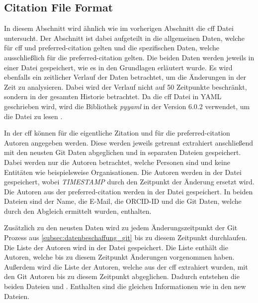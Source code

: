 \subsection{Citation File Format}
\label{subsec:datenbeschaffung_cff}
In diesem Abschnitt wird ähnlich wie im vorherigen Abschnitt die \gls{cff} Datei untersucht.
Der Abschnitt ist dabei aufgeteilt in die allgemeinen Daten, welche für \gls{cff} und \grqq preferred-citation\glqq{} gelten und die spezifischen Daten, welche ausschließlich für die \grqq preferred-citation\glqq{} gelten.
Die beiden Daten werden jeweils in einer  Datei gespeichert, wie es in den Grundlagen erläutert wurde.
Es wird ebenfalls ein zeitlicher Verlauf der Daten betrachtet, um die Änderungen in der Zeit zu analysieren.
Dabei wird der Verlauf nicht auf 50 Zeitpunkte beschränkt, sondern in der gesamten Historie betrachtet.
Da die \gls{cff} Datei in YAML geschrieben wird, wird die Bibliothek \emph{pyyaml} in der Version 6.0.2 verwendet, um die Datei zu lesen \autocite{noauthor_yamlpyyaml_2024}.

In der \gls{cff} können für die eigentliche Zitation und für die \grqq preferred-citation\glqq{} Autoren angegeben werden.
Diese werden jeweils getrennt extrahiert anschließend mit den neusten Git Daten abgeglichen und in separaten Dateien gespeichert.
Dabei werden nur die Autoren betrachtet, welche Personen sind und keine Entitäten wie beispielsweise Organisationen.
Die Autoren werden in der Datei  gespeichert, wobei \emph{TIMESTAMP} durch den Zeitpunkt der Änderung ersetzt wird.
Die Autoren aus der \grqq preferred-citation\glqq{} werden in der Datei  gespeichert.
In beiden Dateien sind der Name, die E-Mail, die ORCID-ID und die Git Daten, welche durch den Abgleich ermittelt wurden, enthalten.

Zusätzlich zu den neusten Daten wird zu jedem Änderungszeitpunkt der Git Prozess aus \autoref{subsec:datenbeschaffung_git} bis zu diesem Zeitpunkt durchlaufen.
Die Liste der Autoren wird in der Datei  gespeichert.
Die Liste enthält die Autoren, welche bis zu diesem Zeitpunkt Änderungen vorgenommen haben.
Außerdem wird die Liste der Autoren, welche aus der \gls{cff} extrahiert wurden, mit den Git Autoren bis zu diesem Zeitpunkt abgeglichen.
Dadurch entstehen die beiden Dateien  und .
Enthalten sind die gleichen Informationen wie in den \glqq new\grqq{} Dateien.

